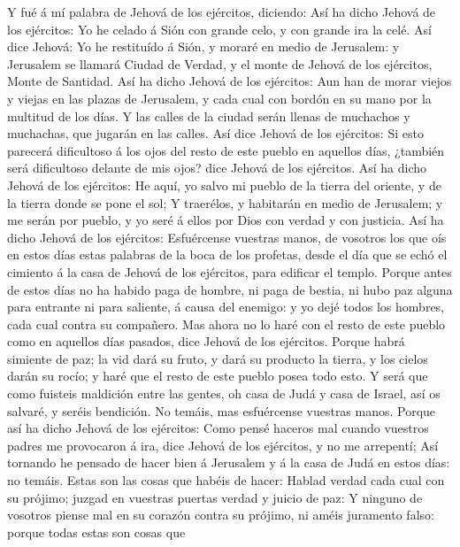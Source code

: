  Y fué á mí palabra de Jehová de los ejércitos, diciendo:
 Así ha dicho Jehová de los ejércitos: Yo he celado á Sión
con grande celo, y con grande ira la celé.  Así dice Jehová:
Yo he restituído á Sión, y moraré en medio de Jerusalem: y Jerusalem se
llamará Ciudad de Verdad, y el monte de Jehová de los ejércitos, Monte
de Santidad.  Así ha dicho Jehová de los ejércitos: Aun han
de morar viejos y viejas en las plazas de Jerusalem, y cada cual con
bordón en su mano por la multitud de los días.  Y las calles
de la ciudad serán llenas de muchachos y muchachas, que jugarán en las
calles.  Así dice Jehová de los ejércitos: Si esto parecerá
dificultoso á los ojos del resto de este pueblo en aquellos días,
¿también será dificultoso delante de mis ojos? dice Jehová de los
ejércitos.  Así ha dicho Jehová de los ejércitos: He aquí,
yo salvo mi pueblo de la tierra del oriente, y de la tierra donde se
pone el sol;  Y traerélos, y habitarán en medio de
Jerusalem; y me serán por pueblo, y yo seré á ellos por Dios con verdad
y con justicia.  Así ha dicho Jehová de los ejércitos:
Esfuércense vuestras manos, de vosotros los que oís en estos días estas
palabras de la boca de los profetas, desde el día que se echó el
cimiento á la casa de Jehová de los ejércitos, para edificar el templo.
 Porque antes de estos días no ha habido paga de hombre, ni
paga de bestia, ni hubo paz alguna para entrante ni para saliente, á
causa del enemigo: y yo dejé todos los hombres, cada cual contra su
compañero.  Mas ahora no lo haré con el resto de este
pueblo como en aquellos días pasados, dice Jehová de los ejércitos.
 Porque habrá simiente de paz; la vid dará su fruto, y dará
su producto la tierra, y los cielos darán su rocío; y haré que el resto
de este pueblo posea todo esto.  Y será que como fuisteis
maldición entre las gentes, oh casa de Judá y casa de Israel, así os
salvaré, y seréis bendición. No temáis, mas esfuércense vuestras manos.
 Porque así ha dicho Jehová de los ejércitos: Como pensé
haceros mal cuando vuestros padres me provocaron á ira, dice Jehová de
los ejércitos, y no me arrepentí;  Así tornando he pensado
de hacer bien á Jerusalem y á la casa de Judá en estos días: no temáis.
 Estas son las cosas que habéis de hacer: Hablad verdad
cada cual con su prójimo; juzgad en vuestras puertas verdad y juicio de
paz:  Y ninguno de vosotros piense mal en su corazón contra
su prójimo, ni améis juramento falso: porque todas estas son cosas que
